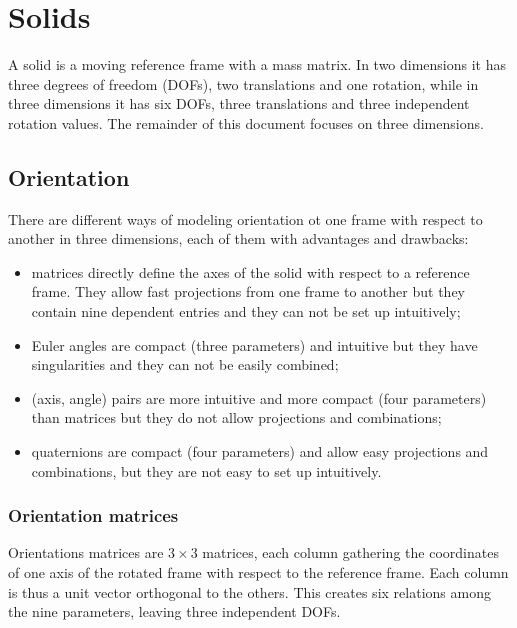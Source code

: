 
\section{Solids}
A solid is a moving reference frame with a mass matrix. In two dimensions it has three degrees of freedom (DOFs), two translations and one rotation, while in three dimensions it has six DOFs, three translations and three independent rotation values. The remainder of this document focuses on three dimensions.

\subsection{Orientation}
There are different ways of modeling orientation ot one frame with respect to another in three dimensions, each of them with advantages and drawbacks:
\begin{itemize}
\item matrices directly define the axes of the solid with respect to a reference frame. They allow fast projections from one frame to another but they contain nine dependent entries and they can not be set up intuitively;
\item Euler angles are compact (three parameters) and intuitive but they have singularities and they can not be easily combined;
 \item (axis, angle) pairs are more intuitive and more compact (four parameters) than matrices but they do not allow projections and combinations;
\item quaternions are compact (four parameters) and allow easy projections and combinations, but they are not easy to set up intuitively.
\end{itemize}

\subsubsection{Orientation matrices}
Orientations matrices are $3\times 3$ matrices, each column gathering the coordinates of one axis of the rotated frame with respect to the reference frame. Each column is thus a unit vector orthogonal to the others. This creates six relations among the nine parameters, leaving three independent DOFs.

